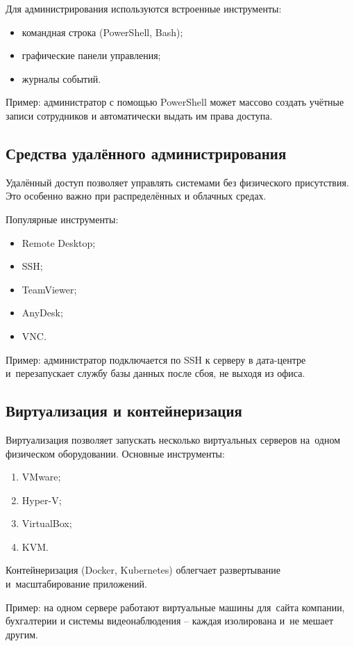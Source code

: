 \documentclass{ou}
\begin{document}
	Для администрирования используются встроенные инструменты:
    \begin{itemize}[label=-, leftmargin=0em, itemindent=3.35em, nosep]
\item командная строка (PowerShell, Bash);
\item графические панели управления;
\item журналы событий.
\end{itemize}

Пример: администратор с помощью PowerShell может массово создать учётные записи сотрудников и автоматически выдать им права доступа.
\subsection{Средства удалённого администрирования}
	Удалённый доступ позволяет управлять системами без физического присутствия. Это особенно важно при распределённых и облачных средах.
    
	Популярные инструменты:
    \begin{itemize}[label=-, leftmargin=0em, itemindent=3.35em, nosep]
\item Remote Desktop;
\item SSH;
\item TeamViewer;
\item AnyDesk;
\item VNC.
\end{itemize}

	Пример: администратор подключается по SSH к серверу в дата-центре и~перезапускает службу базы данных после сбоя, не выходя из офиса.
\subsection{Виртуализация и контейнеризация}
	Виртуализация позволяет запускать несколько виртуальных серверов на~одном физическом оборудовании.
	Основные инструменты:
    \begin{enumerate}[leftmargin=0em, itemindent=3.75em, nosep, label=\arabic*)]
\item VMware;
\item Hyper-V;
\item VirtualBox;
\item KVM.
\end{enumerate}

	Контейнеризация (Docker, Kubernetes) облегчает развертывание и~масштабирование приложений.
    
	Пример: на одном сервере работают виртуальные машины для~сайта компании, бухгалтерии и системы видеонаблюдения -- каждая изолирована и~не мешает другим.
\end{document}
